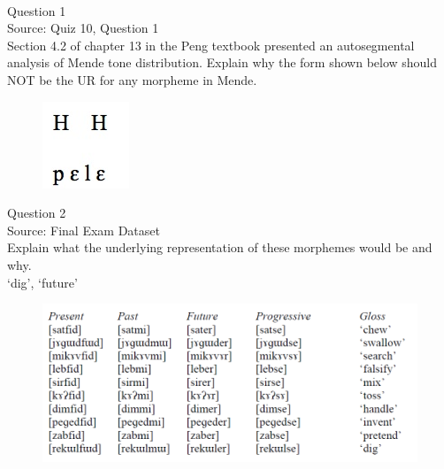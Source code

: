 \documentclass[12pt]{article}
\begin{document}
\newpage

\begin{center}
\textbf{{\color{red}{\HUGE END OF EXAM}}}\\

\end{center}
\newpage

\begin{center}
\textbf{{\color{blue}{\HUGE START OF EXAM\\}}}

\textbf{{\color{blue}{\HUGE Student ID: 6801\\}}}

\textbf{{\color{blue}{\HUGE 3:00 - 3:20 PM\\}}}

\end{center}
\newpage

{\large Question 1}\\

Source: Quiz 10, Question 1\\

Section 4.2 of chapter 13 in the Peng textbook presented an autosegmental analysis of Mende tone distribution. Explain why the form shown below should NOT be the UR for any morpheme in Mende.\\

\begin{figure}[H]
\includegraphics{../images/mende_house_b.png}
\end{figure}

\newpage

{\large Question 2}\\

Source: Final Exam Dataset\\

Explain what the underlying representation of these morphemes would be and why.\\

`dig', `future'

\begin{figure}[H]
\includegraphics{../images/final_dataset.png}
\end{figure}
\end{document}
